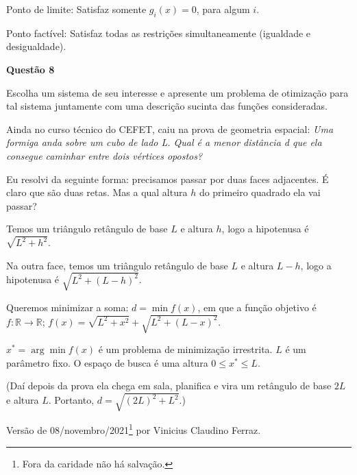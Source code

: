 \documentclass{rbfin}
\begin{document}
\vspace{3mm}

Ponto de limite: Satisfaz somente $g_i(x) = 0$, para algum $i$.

Ponto factível: Satisfaz todas as restrições simultaneamente (igualdade e desigualdade).

\vspace{6mm}

\large

\textbf{Questão 8}

\normalsize

\vspace{6mm}

Escolha um sistema de seu interesse e apresente um problema de otimização para
tal sistema juntamente com uma descrição sucinta das funções consideradas.

\vspace{3mm}

Ainda no curso técnico do CEFET, caiu na prova de geometria espacial: \emph{Uma formiga anda sobre um cubo de lado L. Qual é a menor distância d que ela consegue caminhar entre dois vértices opostos?}

Eu resolvi da seguinte forma: precisamos passar por duas faces adjacentes. É claro que são duas retas. Mas a qual altura $h$ do primeiro quadrado ela vai passar?

Temos um triângulo retângulo de base $L$ e altura $h$, logo a hipotenusa é $\sqrt{L^2 + h^2}$.

Na outra face, temos um triângulo retângulo de base $L$ e altura $L - h$, logo a hipotenusa é $\sqrt{L^2 + (L - h)^2}$.

\newpage

Queremos minimizar a soma: $d = \min f(x)$, em que a função objetivo é $f : \mathbb{R} \to \mathbb{R}$; $f(x) = \sqrt{L^2 + x^2} + \sqrt{L^2 + (L - x)^2}$.

$x^* = \arg \min f(x)$ é um problema de minimização irrestrita. $L$ é um parâmetro fixo. O espaço de busca é uma altura $0 \le x^* \le L$.

(Daí depois da prova ela chega em sala, planifica e vira um retângulo de base $2L$ e altura $L$. Portanto, $d = \sqrt{(2L)^2 + L^2}$.)

\vspace{6mm}

Versão de 08/novembro/2021\footnote{Fora da caridade não há salvação.}  por Vinicius Claudino Ferraz.
\end{document}
